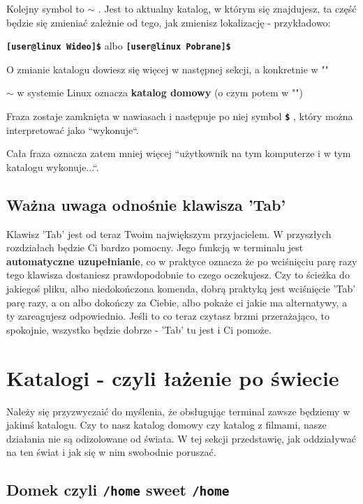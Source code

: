\documentclass[12pt]{article}
\newcommand{\ttbf}[1]{
    \texttt{\textbf{#1}}
}
\begin{document}
Kolejny symbol to \ttbf{$\sim$}. Jest to aktualny katalog, w którym się znajdujesz, ta część będzie się zmieniać zależnie od tego, jak zmienisz lokalizację - przykładowo:

\ttbf{[user@linux Wideo]\$} albo \ttbf{[user@linux Pobrane]\$}

O zmianie katalogu dowiesz się więcej w następnej sekcji, a konkretnie w ""

\ttbf{$\sim$} w systemie Linux oznacza \textbf{katalog domowy} (o czym potem w "")

Fraza zostaje zamknięta w nawiasach i następuje po niej symbol \ttbf{\$}, który można interpretować jako ``wykonuje``.

Cała fraza oznacza zatem mniej więcej ``użytkownik na tym komputerze i w tym katalogu wykonuje...``.

\subsection{Ważna uwaga odnośnie klawisza 'Tab'}

Klawisz 'Tab' jest od teraz Twoim największym przyjacielem. W przyszłych rozdziałach będzie Ci bardzo pomocny. Jego funkcją w terminalu jest \textbf{automatyczne uzupełnianie}, co w praktyce oznacza że po wciśnięciu parę razy tego klawisza dostaniesz prawdopodobnie to czego oczekujesz. Czy to ścieżka do jakiegoś pliku, albo niedokończona komenda, dobrą praktyką jest wciśnięcie 'Tab' parę razy, a on albo dokończy za Ciebie, albo pokaże ci jakie ma alternatywy, a ty zareagujesz odpowiednio. Jeśli to co teraz czytasz brzmi przerażająco, to spokojnie, wszystko będzie dobrze - 'Tab' tu jest i Ci pomoże.

\section{Katalogi - czyli łażenie po świecie}

Należy się przyzwyczaić do myślenia, że obsługując terminal zawsze będziemy w jakimś katalogu. Czy to nasz katalog domowy czy katalog z filmami, nasze działania nie są odizolowane od świata. W tej sekcji przedstawię, jak oddziaływać na ten świat i jak się w nim swobodnie poruszać.

\subsection{Domek czyli \ttbf{/home} sweet \ttbf{/home}}
\label{sec:homedir}
\end{document}
